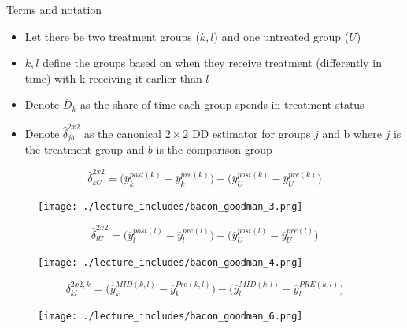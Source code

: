 \documentclass{beamer}
\begin{document}
\begin{frame}{Terms and notation}

\begin{itemize}
\item Let there be two treatment groups ($k,l$) and one untreated group ($U$)
\item $k,l$ define the groups based on when they receive treatment (differently in time) with k receiving it earlier than $l$
\item Denote $\overline{D}_k$ as the share of time each group spends in treatment status
\item Denote $\widehat{\delta}_{jb}^{2x2}$ as the canonical $2\times 2$ DD estimator for groups $j$ and b where $j$ is the treatment group and $b$ is the comparison group
\end{itemize}

\end{frame}





\begin{frame}[plain]
$$\widehat{\delta}^{2x2}_{kU} = \bigg ( \overline{y}_k^{post(k)} - \overline{y}_k^{pre(k)} \bigg ) - \bigg ( \overline{y}_U^{post(k)} - \overline{y}_U^{pre(k)} \bigg ) $$
	\begin{figure}
	\texttt{[image: ./lecture\_includes/bacon\_goodman\_3.png]}
	\end{figure}

\end{frame}

\begin{frame}[plain]
$$\widehat{\delta}^{2x2}_{lU} = \bigg ( \overline{y}_l^{post(l)} - \overline{y}_l^{pre(l)} \bigg ) - \bigg ( \overline{y}_U^{post(l)} - \overline{y}_U^{pre(l)} \bigg ) $$
	\begin{figure}
	\texttt{[image: ./lecture\_includes/bacon\_goodman\_4.png]}
	\end{figure}

\end{frame}


\begin{frame}[plain]

$$\delta_{kl}^{2x2,k} = \bigg ( \overline{y}_k^{MID(k,l)} - \overline{y}_k^{Pre(k,l)} \bigg ) - \bigg ( \overline{y}_l^{MID(k,l)} - \overline{y}_l^{PRE(k,l)} \bigg ) $$

	\begin{figure}
	\texttt{[image: ./lecture\_includes/bacon\_goodman\_6.png]}
	\end{figure}

\end{frame}
\end{document}
